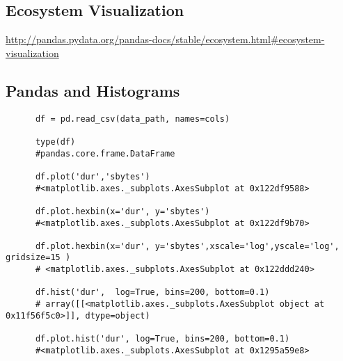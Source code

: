 \documentclass[11pt,a4paper]{article}
\begin{document}
    \subsection{Ecosystem Visualization}
    \href{http://pandas.pydata.org/pandas-docs/stable/ecosystem.html#ecosystem-visualization}{http://pandas.pydata.org/pandas-docs/stable/ecosystem.html\#ecosystem-visualization}\\ 



    \subsection{Pandas and Histograms}
    \begin{lstlisting}
      df = pd.read_csv(data_path, names=cols)

      type(df)
      #pandas.core.frame.DataFrame

      df.plot('dur','sbytes')
      #<matplotlib.axes._subplots.AxesSubplot at 0x122df9588>

      df.plot.hexbin(x='dur', y='sbytes')
      #<matplotlib.axes._subplots.AxesSubplot at 0x122df9b70>
      
      df.plot.hexbin(x='dur', y='sbytes',xscale='log',yscale='log', gridsize=15 )
      # <matplotlib.axes._subplots.AxesSubplot at 0x122ddd240>

      df.hist('dur',  log=True, bins=200, bottom=0.1) 
      # array([[<matplotlib.axes._subplots.AxesSubplot object at 0x11f56f5c0>]], dtype=object)
      
      df.plot.hist('dur', log=True, bins=200, bottom=0.1) 
      #<matplotlib.axes._subplots.AxesSubplot at 0x1295a59e8>
    \end{lstlisting}











\end{document}
